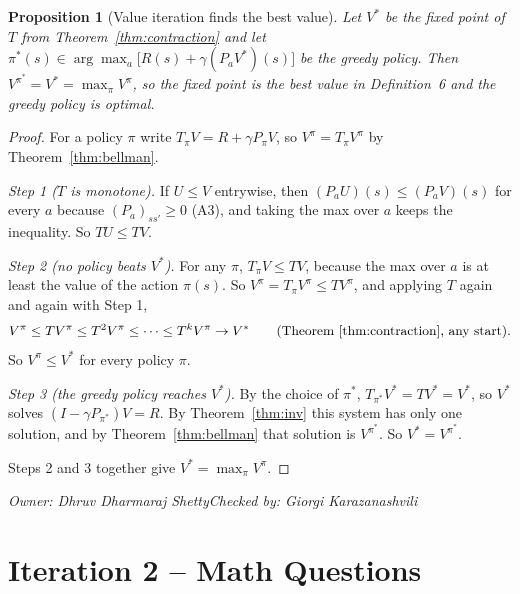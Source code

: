 \documentclass[10pt]{article}
\newtheorem{proposition}[theorem]{Proposition}
\theoremstyle{definition}
\newcommand{\GK}{Giorgi Karazanashvili}
\newcommand{\DS}{Dhruv Dharmaraj Shetty}
\newcommand{\signoff}[2]{\par\smallskip\hfill\emph{Owner: #1}\qquad\emph{Checked by: #2}\par\medskip}
\begin{document}
\begin{proposition}[Value iteration finds the best value]\label{prop:optimal}
Let $V^*$ be the fixed point of $T$ from Theorem~\ref{thm:contraction} and let $\pi^*(s)\in\arg\max_a\big[R(s) + \gamma(P_aV^*)(s)\big]$ be the greedy policy. Then $V^{\pi^*} = V^* = \max_\pi V^\pi$, so the fixed point is the best value in Definition~6 and the greedy policy is optimal.
\end{proposition}
\begin{proof}
For a policy $\pi$ write $T_\pi V = R + \gamma P_\pi V$, so $V^\pi = T_\pi V^\pi$ by Theorem~\ref{thm:bellman}.

\emph{Step 1 ($T$ is monotone).} If $U\le V$ entrywise, then $(P_aU)(s)\le(P_aV)(s)$ for every $a$ because $(P_a)_{ss'}\ge0$ (A3), and taking the max over $a$ keeps the inequality. So $TU\le TV$.

\emph{Step 2 (no policy beats $V^*$).} For any $\pi$, $T_\pi V\le TV$, because the max over $a$ is at least the value of the action $\pi(s)$. So $V^\pi = T_\pi V^\pi\le TV^\pi$, and applying $T$ again and again with Step 1,
\[
V^\pi\le TV^\pi\le T^2V^\pi\le\cdots\le T^kV^\pi\to V^* \qquad\text{(Theorem~\ref{thm:contraction}, any start).}
\]
So $V^\pi\le V^*$ for every policy $\pi$.

\emph{Step 3 (the greedy policy reaches $V^*$).} By the choice of $\pi^*$, $T_{\pi^*}V^* = TV^* = V^*$, so $V^*$ solves $(I-\gamma P_{\pi^*})V = R$. By Theorem~\ref{thm:inv} this system has only one solution, and by Theorem~\ref{thm:bellman} that solution is $V^{\pi^*}$. So $V^* = V^{\pi^*}$.

Steps 2 and 3 together give $V^* = \max_\pi V^\pi$.
\end{proof}
\signoff{\DS}{\GK}

\section{Iteration 2 -- Math Questions}
\end{document}

